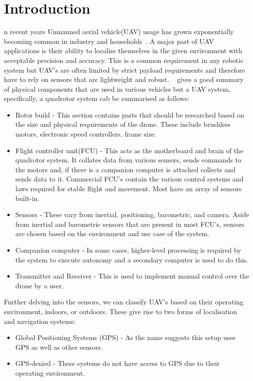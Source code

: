 \let\textcircled=\pgftextcircled
\chapter{Introduction}\label{ch:intro}%
    n recent years Unmanned aerial vehicle(UAV) usage has grown exponentially becoming common in industry and households~\cite{custers2016drones}.
    A major part of UAV applications is their ability to localise themselves in the given environment with acceptable precision and accuracy.
    This is a common requirement in any robotic system but UAV's are often limited by strict payload requirements and therefore have to rely on sensors that are lightweight and robust.
    ~\citep{ardupilotadvanced} gives a good summary of physical components that are used in various vehicles but a UAV system, specifically, a quadrotor system cab be summarised as follows:
    \begin{itemize}
        \item Rotor build - This section contains parts that should be researched based on the size and physical requirements of the drone.
        These include brushless motors, electronic speed controllers, frame size.
        \item Flight controller unit(FCU) - This acts as the motherboard and brain of the quadrotor system.
        It collates data from various sensors, sends commands to the motors and, if there is a companion computer is attached collects and sends data to it.
        Commercial FCU's contain the various control systems and laws required for stable flight and movement.
        Most have an array of sensors built-in.
        \item Sensors - These vary from inertial, positioning, barometric, and camera.
        Aside from inertial and barometric sensors that are present in most FCU's, sensors are chosen based on the environment and use case of the system.
        \item Companion computer - In some cases, higher-level processing is required by the system to execute autonomy and a secondary computer is used to do this.
        \item Transmitter and Receiver - This is used to implement manual control over the drone by a user.
    \end{itemize}

Further delving into the sensors, we can classify UAV's based on their operating environment, indoors, or outdoors.
These give rise to two forms of localisation and navigation systems:
    \begin{itemize}
        \item Global Positioning Systems (GPS) - As the name suggests this setup uses GPS as well as other sensors.
        \item GPS-denied - These systems do not have access to GPS due to their operating environment.
    \end{itemize}


